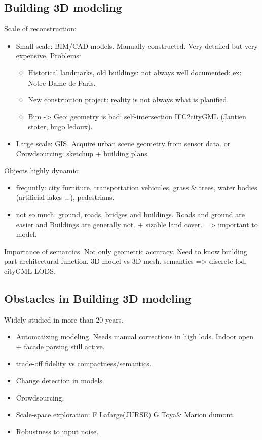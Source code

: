     \subsection{Building 3D modeling}
        Scale of reconstruction:
        \begin{itemize}
            \item Small scale: BIM/CAD models. Manually constructed. Very detailed but very expensive. Problems:
            \begin{itemize}
                \item Historical landmarks, old buildings: not always well documented: ex: Notre Dame de Paris.
                \item New construction project: reality is not always what is planified.
                \item Bim -> Geo: geometry is bad: self-intersection IFC2cityGML (Jantien stoter, hugo ledoux).
            \end{itemize}
            \item Large scale: GIS. Acquire urban scene geometry from sensor data. or Crowdsourcing: sketchup + building plans.
        \end{itemize}
        Objects highly dynamic:
        \begin{itemize}
            \item frequntly: city furniture, transportation vehicules, grass \& trees, water bodies (artificial lakes ...), pedestrians.
            \item not so much: ground, roads, bridges and buildings. Roads and ground are easier and Buildings are generally not. + sizable land cover. => important to model.\\
        \end{itemize}
        Importance of semantics. Not only geometric accuracy. Need to know building part architectural function. 3D model vs 3D mesh.
        semantics => discrete lod. cityGML LODS.\\
    \subsection{Obstacles in Building 3D modeling}
        Widely studied in more than 20 years.\\
        \begin{itemize}
            \item Automatizing modeling. Needs manual corrections in high lods. Indoor open + facade parsing still active.
            \item trade-off fidelity vs compactness/semantics.
            \item Change detection in models.
            \item Crowdsourcing.
            \item Scale-space exploration: F Lafarge(JURSE) G Toya\& Marion dumont.
            \item Robustness to input noise.
        \end{itemize}

